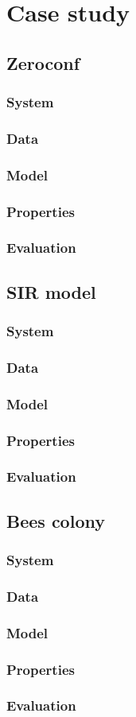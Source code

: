 \chapter{Case study}

\section{Zeroconf}
\subsection{System}
\subsection{Data}
\subsection{Model}
\subsection{Properties}
\subsection{Evaluation}

\section{SIR model}
\subsection{System}
\subsection{Data}
\subsection{Model}
\subsection{Properties}
\subsection{Evaluation}


\section{Bees colony}
\subsection{System}
\subsection{Data}
\subsection{Model}
\subsection{Properties}
\subsection{Evaluation}


